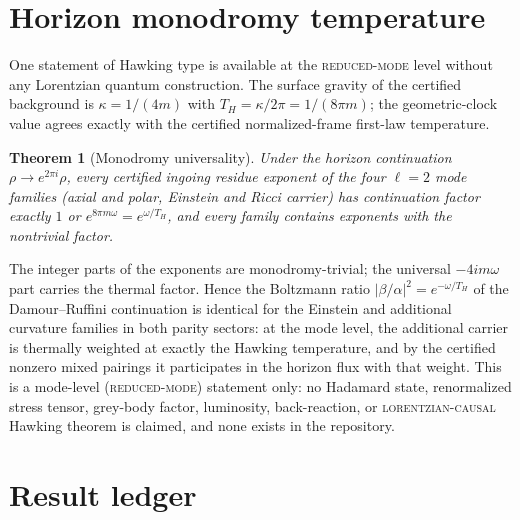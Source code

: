 \documentclass[11pt]{article}
\newtheorem{theorem}{Theorem}[section]
\theoremstyle{definition}
\theoremstyle{remark}
\begin{document}
\section{Horizon monodromy temperature}

One statement of Hawking type is available at the
\textsc{reduced-mode} level without any Lorentzian quantum construction.
The surface gravity of the certified background is \(\kappa=1/(4m)\) with
\(T_H=\kappa/2\pi=1/(8\pi m)\); the geometric-clock value agrees exactly
with the certified normalized-frame first-law temperature.

\begin{theorem}[Monodromy universality]
Under the horizon continuation \(\rho\to e^{2\pi i}\rho\), every certified
ingoing residue exponent of the four \(\ell=2\) mode families (axial and
polar, Einstein and Ricci carrier) has continuation factor exactly \(1\) or
\(e^{8\pi m\omega}=e^{\omega/T_H}\), and every family contains exponents
with the nontrivial factor.
\end{theorem}

The integer parts of the exponents are monodromy-trivial; the universal
\(-4im\omega\) part carries the thermal factor.  Hence the Boltzmann ratio
\(|\beta/\alpha|^2=e^{-\omega/T_H}\) of the Damour--Ruffini continuation is
identical for the Einstein and additional curvature families in both parity
sectors: at the mode level, the additional carrier is thermally weighted at
exactly the Hawking temperature, and by the certified nonzero mixed
pairings it participates in the horizon flux with that weight.  This is a
mode-level (\textsc{reduced-mode}) statement only: no Hadamard state,
renormalized stress tensor, grey-body factor, luminosity, back-reaction, or
\textsc{lorentzian-causal} Hawking theorem is claimed, and none exists in
the repository.

\section{Result ledger}
\end{document}
